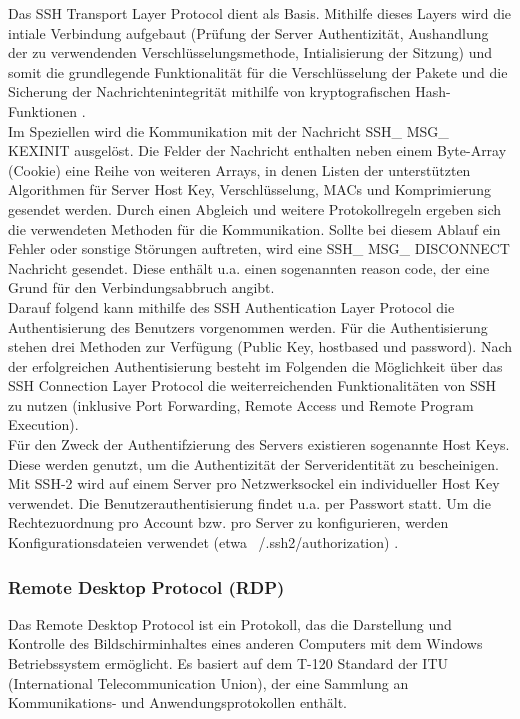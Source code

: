 Das SSH Transport Layer Protocol dient als Basis. Mithilfe dieses Layers wird die intiale Verbindung aufgebaut (Prüfung der Server Authentizität, Aushandlung der zu verwendenden Verschlüsselungsmethode, Intialisierung der Sitzung) und somit die grundlegende Funktionalität für die Verschlüsselung der Pakete und die Sicherung der Nachrichtenintegrität mithilfe von kryptografischen Hash-Funktionen \citep{SSH1}. \\%

Im Speziellen wird die Kommunikation mit der Nachricht \glqq SSH\_ MSG\_ KEXINIT\grqq{}  ausgelöst. Die Felder der Nachricht enthalten neben einem Byte-Array (Cookie) eine Reihe von weiteren Arrays, in denen Listen der unterstützten Algorithmen für Server Host Key, Verschlüsselung, MACs und Komprimierung gesendet werden. 
Durch einen Abgleich und weitere Protokollregeln ergeben sich die verwendeten Methoden für die Kommunikation. Sollte bei diesem Ablauf ein Fehler oder sonstige Störungen auftreten, wird eine \glqq SSH\_ MSG\_ DISCONNECT\grqq{}  Nachricht gesendet. Diese enthält u.a. einen sogenannten \glqq reason code\grqq , der eine Grund für den Verbindungsabbruch angibt.\\

Darauf folgend kann mithilfe des SSH Authentication Layer Protocol die Authentisierung des Benutzers vorgenommen werden. Für die Authentisierung stehen drei Methoden zur Verfügung (\glqq Public Key\grqq , \glqq hostbased\grqq{}  und \glqq password\grqq ). Nach der erfolgreichen Authentisierung besteht im Folgenden die Möglichkeit über das SSH Connection Layer Protocol die weiterreichenden Funktionalitäten von SSH zu nutzen (inklusive Port Forwarding, Remote Access und Remote Program Execution)\citep{SSH1}. \\%


Für den Zweck der Authentifzierung des Servers existieren sogenannte \glqq Host Keys\grqq . Diese werden genutzt, um die Authentizität der Serveridentität zu bescheinigen. Mit SSH-2 wird auf einem Server pro Netzwerksockel ein individueller Host Key verwendet. Die Benutzerauthentisierung findet u.a. per Passwort statt. Um die Rechtezuordnung pro Account bzw. pro Server zu konfigurieren, werden Konfigurationsdateien verwendet (etwa ~/.ssh2/authorization) \citep{SSH1}.

\subsubsection{Remote Desktop Protocol (RDP)}
Das Remote Desktop Protocol ist ein Protokoll, das die Darstellung und Kontrolle des Bildschirminhaltes eines anderen Computers mit dem Windows Betriebssystem ermöglicht. Es basiert auf dem T-120 Standard der ITU (International Telecommunication Union), der eine Sammlung an Kommunikations- und Anwendungsprotokollen enthält.

